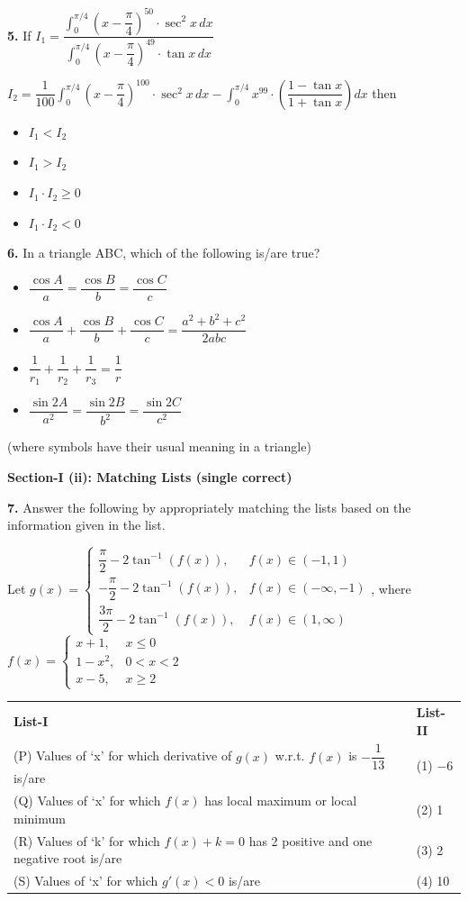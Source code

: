 \documentclass[10pt,twocolumn]{extarticle}
\renewcommand{\arraystretch}{1.15}
\newenvironment{qoptions}{\begin{itemize}[leftmargin=1.8em,itemsep=2pt,topsep=2pt,label={}]}{\end{itemize}}
\newcommand{\opt}[2]{\item[({#1})] {#2}}
\newcommand{\subsectionhdr}[1]{\par\vspace{3pt}\noindent\textbf{#1}\par\vspace{2pt}}
\begin{document}
\textbf{5.} If $I_1=\dfrac{\displaystyle\int_0^{\pi/4}\left(x-\dfrac{\pi}{4}\right)^{50}\cdot\sec^2x\,dx}{\displaystyle\int_0^{\pi/4}\left(x-\dfrac{\pi}{4}\right)^{49}\cdot\tan x\,dx}$

$I_2=\dfrac{1}{100}\displaystyle\int_0^{\pi/4}\left(x-\dfrac{\pi}{4}\right)^{100}\cdot\sec^2x\,dx-\displaystyle\int_0^{\pi/4}x^{99}\cdot\left(\dfrac{1-\tan x}{1+\tan x}\right)dx$ then
\begin{qoptions}
\opt{A}{$I_1<I_2$}
\opt{B}{$I_1>I_2$}
\opt{C}{$I_1\cdot I_2\ge0$}
\opt{D}{$I_1\cdot I_2<0$}
\end{qoptions}

\textbf{6.} In a triangle ABC, which of the following is/are true?
\begin{qoptions}
\opt{A}{$\dfrac{\cos A}{a}=\dfrac{\cos B}{b}=\dfrac{\cos C}{c}$}
\opt{B}{$\dfrac{\cos A}{a}+\dfrac{\cos B}{b}+\dfrac{\cos C}{c}=\dfrac{a^2+b^2+c^2}{2abc}$}
\opt{C}{$\dfrac{1}{r_1}+\dfrac{1}{r_2}+\dfrac{1}{r_3}=\dfrac{1}{r}$}
\opt{D}{$\dfrac{\sin2A}{a^2}=\dfrac{\sin2B}{b^2}=\dfrac{\sin2C}{c^2}$}
\end{qoptions}
(where symbols have their usual meaning in a triangle)

\subsectionhdr{Section-I (ii): Matching Lists (single correct)}

\textbf{7.} Answer the following by appropriately matching the lists based on the information given in the list.

Let $g(x)=\begin{cases}\dfrac{\pi}{2}-2\tan^{-1}(f(x)), & f(x)\in(-1,1)\\[4pt] -\dfrac{\pi}{2}-2\tan^{-1}(f(x)), & f(x)\in(-\infty,-1)\\[4pt] \dfrac{3\pi}{2}-2\tan^{-1}(f(x)), & f(x)\in(1,\infty)\end{cases}$, where $f(x)=\begin{cases}x+1, & x\le0\\ 1-x^2, & 0<x<2\\ x-5, & x\ge2\end{cases}$

\begin{center}
\renewcommand{\arraystretch}{1.25}
\begin{tabular}{@{}p{5.4cm}p{2.2cm}@{}}
\textbf{List-I} & \textbf{List-II} \\
(P) Values of `x' for which derivative of $g(x)$ w.r.t. $f(x)$ is $-\dfrac{1}{13}$ is/are & (1) $-6$ \\[4pt]
(Q) Values of `x' for which $f(x)$ has local maximum or local minimum & (2) 1 \\[4pt]
(R) Values of `k' for which $f(x)+k=0$ has 2 positive and one negative root is/are & (3) 2 \\[4pt]
(S) Values of `x' for which $g'(x)<0$ is/are & (4) 10 \\
\end{tabular}
\renewcommand{\arraystretch}{1.15}
\end{center}
\end{document}
